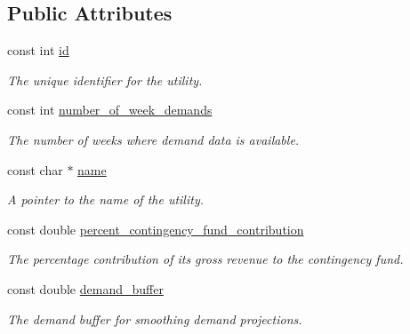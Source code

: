 \subsection*{Public Attributes}
\begin{DoxyCompactItemize}
\item 
const int \mbox{\hyperlink{classUtility_ad41c4ea5c911c5000452a3371cd65d5f}{id}}
\begin{DoxyCompactList}\small\item\em The unique identifier for the utility. \end{DoxyCompactList}\item 
const int \mbox{\hyperlink{classUtility_a0548db3746582251082aa430db49dad0}{number\+\_\+of\+\_\+week\+\_\+demands}}
\begin{DoxyCompactList}\small\item\em The number of weeks where demand data is available. \end{DoxyCompactList}\item 
const char $\ast$ \mbox{\hyperlink{classUtility_ad0ce5c179a7f5ceb46d4fcae08dbfb47}{name}}
\begin{DoxyCompactList}\small\item\em A pointer to the name of the utility. \end{DoxyCompactList}\item 
const double \mbox{\hyperlink{classUtility_a7b1a097ec188be8e7175d058b5e6596c}{percent\+\_\+contingency\+\_\+fund\+\_\+contribution}}
\begin{DoxyCompactList}\small\item\em The percentage contribution of its gross revenue to the contingency fund. \end{DoxyCompactList}\item 
const double \mbox{\hyperlink{classUtility_a4be9760339ec06e5c932890da8e566b3}{demand\+\_\+buffer}}
\begin{DoxyCompactList}\small\item\em The demand buffer for smoothing demand projections. \end{DoxyCompactList}\end{DoxyCompactItemize}
